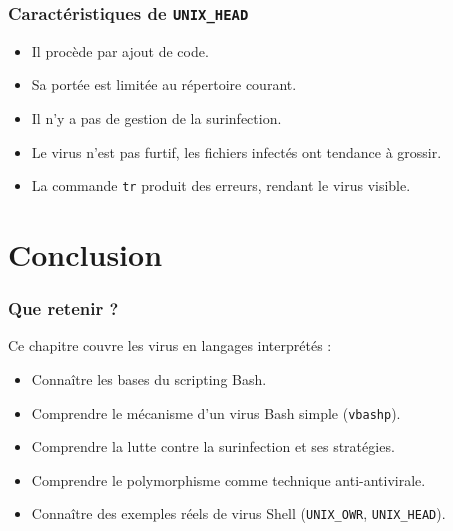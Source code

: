 \documentclass{beamer}
\begin{document}
\begin{frame}
\frametitle{Caractéristiques de \texttt{UNIX\_HEAD}}
\begin{itemize}
\item Il procède par ajout de code.
\item Sa portée est limitée au répertoire courant.
\item Il n'y a pas de gestion de la surinfection.
\item Le virus n'est pas furtif, les fichiers infectés ont tendance à grossir.
\item La commande \texttt{tr} produit des erreurs, rendant le virus visible.
\end{itemize}
\end{frame}


\section{Conclusion}

\begin{frame}
  \frametitle{Que retenir ?}
  Ce chapitre couvre les virus en langages interprétés :
  \begin{itemize}
  \item Connaître les bases du scripting Bash.
  \item Comprendre le mécanisme d'un virus Bash simple (\texttt{vbashp}).
  \item Comprendre la lutte contre la surinfection et ses stratégies.
  \item Comprendre le polymorphisme comme technique anti-antivirale.
  \item Connaître des exemples réels de virus Shell (\texttt{UNIX\_OWR}, \texttt{UNIX\_HEAD}).
  \end{itemize}
\end{frame}
\end{document}

